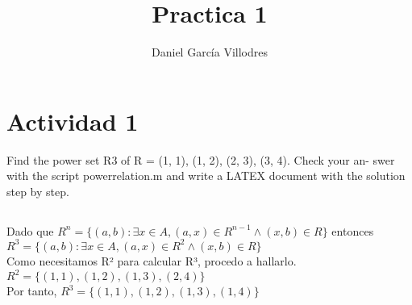 \documentclass[11pt]{article}
\title{\textbf{Practica 1}}
\author{Daniel García Villodres}
\date{}
\begin{document}
\maketitle
\thispagestyle{empty}

\section*{Actividad 1}
Find the power set R3 of R = {(1, 1), (1, 2), (2, 3), (3, 4)}. Check your an-
swer with the script powerrelation.m and write a LATEX document with the
solution step by step.

\subsection*{}

Dado que $R^n = \lbrace(a,b):\exists x \in A, (a,x) \in R^{n-1} \land (x,b) \in R \rbrace$ entonces $R^3 = \lbrace(a,b):\exists x \in A, (a,x) \in R^{2} \land (x,b) \in R \rbrace$ \\
Como necesitamos R² para calcular R³, procedo a hallarlo.\\
$R^2 = \lbrace(1,1),(1,2),(1,3),(2,4)\rbrace$ \\
Por tanto, $R^3 = \lbrace(1,1),(1,2),(1,3),(1,4)\rbrace$
\end{document}
